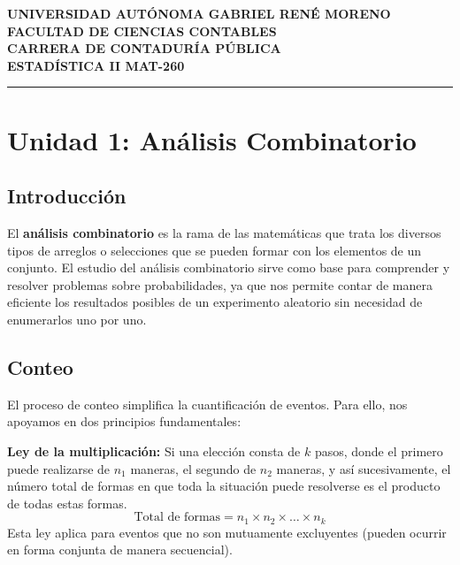 \documentclass[12pt,a4paper]{article}
\begin{document}
\begin{center}
    \textbf{\Large UNIVERSIDAD AUTÓNOMA GABRIEL RENÉ MORENO} \\[0.2cm]
    \textbf{\large FACULTAD DE CIENCIAS CONTABLES} \\[0.2cm]
    \textbf{\large CARRERA DE CONTADURÍA PÚBLICA} \\[0.5cm]
    \textbf{\large ESTADÍSTICA II MAT-260} \\[1cm]
\end{center}

\tableofcontents
\vspace{1cm}
\hrule
\vspace{1cm}

\section{Unidad 1: Análisis Combinatorio}

\subsection{Introducción}
El \textbf{análisis combinatorio} es la rama de las matemáticas que trata los diversos tipos de arreglos o selecciones que se pueden formar con los elementos de un conjunto. 
El estudio del análisis combinatorio sirve como base para comprender y resolver problemas sobre probabilidades, ya que nos permite contar de manera eficiente los resultados posibles de un experimento aleatorio sin necesidad de enumerarlos uno por uno.

\subsection{Conteo}
El proceso de conteo simplifica la cuantificación de eventos. Para ello, nos apoyamos en dos principios fundamentales:

\textbf{Ley de la multiplicación:} Si una elección consta de $k$ pasos, donde el primero puede realizarse de $n_{1}$ maneras, el segundo de $n_{2}$ maneras, y así sucesivamente, el número total de formas en que toda la situación puede resolverse es el producto de todas estas formas.
\[
\text{Total de formas} = n_{1} \times n_{2} \times \dots \times n_{k}
\]
Esta ley aplica para eventos que no son mutuamente excluyentes (pueden ocurrir en forma conjunta de manera secuencial).
\end{document}
